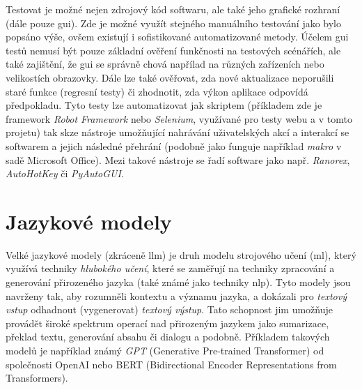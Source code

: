 \documentclass[czech, ma, kiv, he, iso690alph, pdf, viewonly]{fasthesis}
\begin{document}
    Testovat je možné nejen zdrojový kód softwaru, ale také jeho grafické rozhraní (dále pouze \Acrshort{gui}). Zde je možné využít stejného manuálního testování jako bylo popsáno výše, ovšem existují i sofistikované automatizované metody. Účelem \Acrshort{gui} testů nemusí být pouze základní ověření funkčnosti na testových scénářích, ale také zajištění, že \Acrshort{gui} se správně chová napřílad na různých zařízeních nebo velikostích obrazovky. Dále lze také ověřovat, zda nové aktualizace neporušili staré funkce (regresní testy) či zhodnotit, zda výkon aplikace odpovídá předpokladu. Tyto testy lze automatizovat jak skriptem (příkladem zde je framework \textit{Robot Framework} nebo \textit{Selenium}, využívané pro testy webu a v tomto projetu) tak skze nástroje umožňující nahrávání uživatelských akcí a interakcí se softwarem a jejich následné přehrání (podobně jako funguje například \textit{makro} v sadě Microsoft Office). Mezi takové nástroje se řadí software jako např. \textit{Ranorex}, \textit{AutoHotKey} či \textit{PyAutoGUI}. \cite{alegroth2016maintenance}


    \section{Jazykové modely}

    Velké jazykové modely (zkráceně \Gls{llm}) je druh modelu strojového učení (\Acrshort{ml}), který využívá techniky \textit{hlubokého učení}, které se zaměřují na techniky zpracování a generování přirozeného jazyka (také známé jako techniky \Acrshort{nlp}). Tyto modely jsou navrženy tak, aby rozumněli kontextu a významu jazyka, a dokázali pro \textit{textový vstup} odhadnout (vygenerovat) \textit{textový výstup}. Tato schopnost jim umožňuje provádět široké spektrum operací nad přirozeným jazykem jako sumarizace, překlad textu, generování absahu či dialogu a podobně. Příkladem takových modelů je například známý \textit{GPT} (Generative Pre-trained Transformer) od společnosti OpenAI nebo BERT (Bidirectional Encoder Representations from Transformers).
    \cite{devlin2019bert} \cite{googleML2023} \cite{cloudflareLLM2023}
\end{document}
